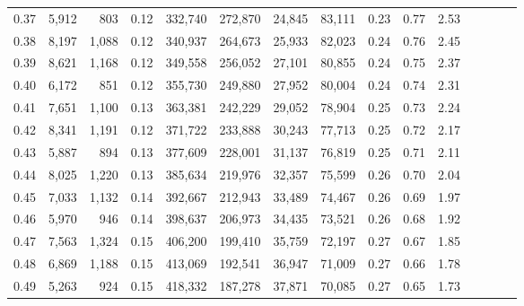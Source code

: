 \begin{tabular}{rrrcrrrrrrrrrrr}
0.37 &   5,912 &     803 &                                       0.12 &  332,740 &  272,870 &   24,845 &   83,111 &  0.23 &  0.77 &                         2.53 \\
0.38 &   8,197 &   1,088 &                                       0.12 &  340,937 &  264,673 &   25,933 &   82,023 &  0.24 &  0.76 &                         2.45 \\
0.39 &   8,621 &   1,168 &                                       0.12 &  349,558 &  256,052 &   27,101 &   80,855 &  0.24 &  0.75 &                         2.37 \\
0.40 &   6,172 &     851 &                                       0.12 &  355,730 &  249,880 &   27,952 &   80,004 &  0.24 &  0.74 &                         2.31 \\
0.41 &   7,651 &   1,100 &                                       0.13 &  363,381 &  242,229 &   29,052 &   78,904 &  0.25 &  0.73 &                         2.24 \\
0.42 &   8,341 &   1,191 &                                       0.12 &  371,722 &  233,888 &   30,243 &   77,713 &  0.25 &  0.72 &                         2.17 \\
0.43 &   5,887 &     894 &                                       0.13 &  377,609 &  228,001 &   31,137 &   76,819 &  0.25 &  0.71 &                         2.11 \\
0.44 &   8,025 &   1,220 &                                       0.13 &  385,634 &  219,976 &   32,357 &   75,599 &  0.26 &  0.70 &                         2.04 \\
0.45 &   7,033 &   1,132 &                                       0.14 &  392,667 &  212,943 &   33,489 &   74,467 &  0.26 &  0.69 &                         1.97 \\
0.46 &   5,970 &     946 &                                       0.14 &  398,637 &  206,973 &   34,435 &   73,521 &  0.26 &  0.68 &                         1.92 \\
0.47 &   7,563 &   1,324 &                                       0.15 &  406,200 &  199,410 &   35,759 &   72,197 &  0.27 &  0.67 &                         1.85 \\
0.48 &   6,869 &   1,188 &                                       0.15 &  413,069 &  192,541 &   36,947 &   71,009 &  0.27 &  0.66 &                         1.78 \\
0.49 &   5,263 &     924 &                                       0.15 &  418,332 &  187,278 &   37,871 &   70,085 &  0.27 &  0.65 &                         1.73 \\

\end{tabular}
